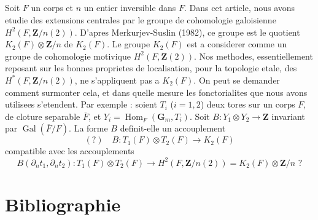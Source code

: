 \documentclass[11pt,a4paper]{article}
\theoremstyle{plain}
\theoremstyle{definition}
\DeclareMathOperator{\Gal}{Gal}
\DeclareMathOperator{\Hom}{Hom}
\begin{document}
\subsection{}\label{7.11}

Soit $F$ un corps et $n$ un entier inversible dans $F$. Dans cet article, nous avons etudie des extensions centrales par le groupe de cohomologie galoisienne $H^2(F, \mathbf{Z}/n(2))$. D'apres Merkurjev-Suslin (1982), ce groupe est le quotient $K_2(F) \otimes \mathbf{Z}/n$ de $K_2(F)$. Le groupe $K_2(F)$ est a considerer comme un groupe de cohomologie motivique $H^2(F, \mathbf{Z}(2))$. Nos methodes, essentiellement reposant sur les bonnes proprietes de localisation, pour la topologie etale, des $H^*(F, \mathbf{Z}/n(2))$, ne s'appliquent pas a $K_2(F)$. On peut se demander comment surmonter cela, et dans quelle mesure les fonctorialites que nous avons utilisees s'etendent. Par exemple : soient $T_i$ ($i = 1, 2$) deux tores sur un corps $F$, de cloture separable $\overline{F}$, et $Y_i = \Hom_{\overline{F}}(\mathbf{G}_m, T_i)$. Soit $B : Y_1 \otimes Y_2 \to \mathbf{Z}$ invariant par $\Gal(\overline{F}/F)$. La forme $B$ definit-elle un accouplement
\[
(?) \quad B : T_1(F) \otimes T_2(F) \to K_2(F)
\]
compatible avec les accouplements
\[
B(\partial_n t_1, \partial_n t_2) : T_1(F) \otimes T_2(F) \to H^2(F, \mathbf{Z}/n(2)) = K_2(F) \otimes \mathbf{Z}/n \text{ ?}
\]

\section*{Bibliographie}
\end{document}

